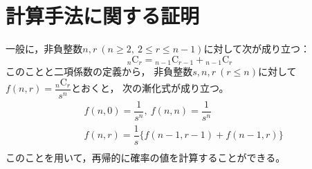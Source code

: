 \documentclass{article}
\begin{document}
\section{計算手法に関する証明}

一般に，非負整数$n, r\ (n \geq 2,\ 2 \leq r \leq n - 1)$に対して次が成り立つ：
\begin{equation*}
    {}_n \mathrm{C}_r = {}_{n-1} \mathrm{C}_{r-1} + {}_{n-1} \mathrm{C}_{r}
\end{equation*}
このことと二項係数の定義から，
非負整数$s, n, r\ (r \leq n)$に対して$f(n, r) = \dfrac{{}_n \mathrm{C}_r}{s^n}$とおくと，
次の漸化式が成り立つ。
\begin{eqnarray*}
    &f(n, 0) = \dfrac{1}{s^n},\ f(n, n) = \dfrac{1}{s^n} \\
    &f(n, r) = \dfrac{1}{s} \{f(n-1, r-1) + f(n-1, r)\} \\
\end{eqnarray*}
このことを用いて，再帰的に確率の値を計算することができる。
\end{document}
